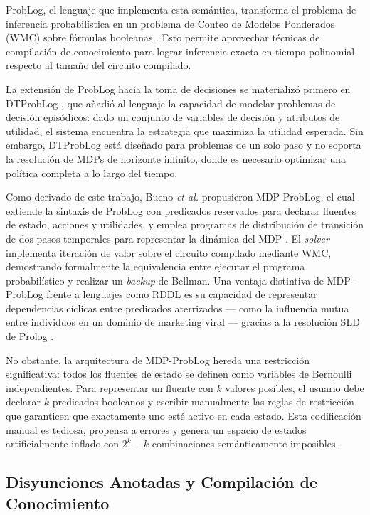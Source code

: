 ProbLog, el lenguaje que implementa esta semántica, transforma el problema de inferencia probabilística en un problema de Conteo de Modelos Ponderados (WMC) sobre fórmulas booleanas \cite{fierens2015inference, deraedt2007problog}. Esto permite aprovechar técnicas de compilación de conocimiento para lograr inferencia exacta en tiempo polinomial respecto al tamaño del circuito compilado.

La extensión de ProbLog hacia la toma de decisiones se materializó primero en DTProbLog \cite{vandenbroeck2010dtproblog}, que añadió al lenguaje la capacidad de modelar problemas de decisión episódicos: dado un conjunto de variables de decisión y atributos de utilidad, el sistema encuentra la estrategia que maximiza la utilidad esperada. Sin embargo, DTProbLog está diseñado para problemas de un solo paso y no soporta la resolución de MDPs de horizonte infinito, donde es necesario optimizar una política completa a lo largo del tiempo.

Como derivado de este trabajo, Bueno \textit{et al.} propusieron MDP-ProbLog, el cual extiende la sintaxis de ProbLog con predicados reservados para declarar fluentes de estado, acciones y utilidades, y emplea programas de distribución de transición de dos pasos temporales para representar la dinámica del MDP \cite{bueno2016mdp}. El \textit{solver} implementa iteración de valor sobre el circuito compilado mediante WMC, demostrando formalmente la equivalencia entre ejecutar el programa probabilístico y realizar un \textit{backup} de Bellman. Una ventaja distintiva de MDP-ProbLog frente a lenguajes como RDDL es su capacidad de representar dependencias cíclicas entre predicados aterrizados --- como la influencia mutua entre individuos en un dominio de marketing viral --- gracias a la resolución SLD de Prolog \cite{bueno2016mdp}.

No obstante, la arquitectura de MDP-ProbLog hereda una restricción significativa: todos los fluentes de estado se definen como variables de Bernoulli independientes. Para representar un fluente con $k$ valores posibles, el usuario debe declarar $k$ predicados booleanos y escribir manualmente las reglas de restricción que garanticen que exactamente uno esté activo en cada estado. Esta codificación manual es tediosa, propensa a errores y genera un espacio de estados artificialmente inflado con $2^k - k$ combinaciones semánticamente imposibles.

\subsection{Disyunciones Anotadas y Compilación de Conocimiento}
\label{sec:ea-ads-compilacion}

